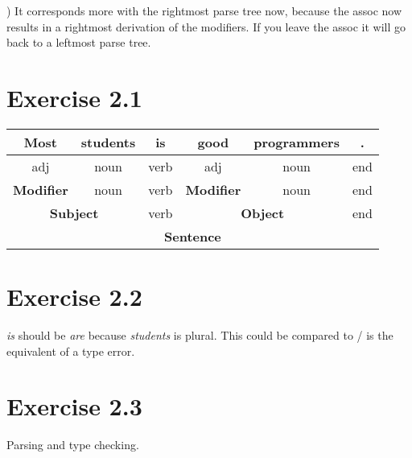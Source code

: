 \documentclass[11pt]{article} %
\begin{document}
) It corresponds more with the rightmost parse tree now, because the assoc now results in a rightmost derivation of the modifiers.
If you leave the assoc it will go back to a leftmost parse tree.


\iffalse
\section*{Exercise 2.1}
\begin{tabular}{|c|c|c|c|c|c|}	\hline
Most 				& students 			& is 	& good 					& programmers 	& . 		\\\hline
adj 				& noun 				& verb 	& adj 					& noun 			& end 		\\\hline
\textbf{Modifier}	& noun				& verb	& \textbf{Modifier}		& noun			& end		\\\hline
\multicolumn{2}{|c|}{\textbf{Subject}}	& verb 	& \multicolumn{2}{c|}{\textbf{Object}}	& end		\\\hline
\multicolumn{6}{|c|}{\textbf{Sentence}}																\\\hline
\end{tabular}

\section*{Exercise 2.2}
\textit{is} should be \textit{are} because \textit{students} is plural. This could be compared to / is the equivalent
of a type error.

\section*{Exercise 2.3}
Parsing and type checking.
\end{document}
